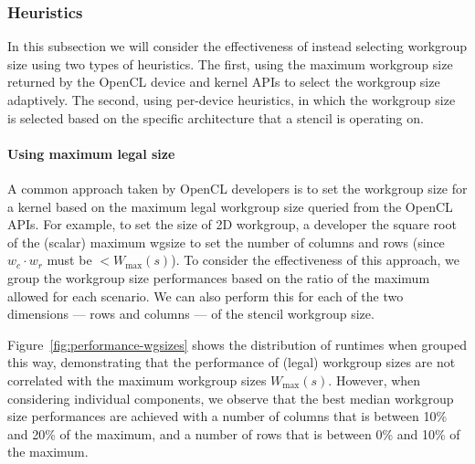 \documentclass[nonatbib,preprint,10pt]{sigplanconf}
\begin{document}
\subsubsection{Heuristics}

In this subsection we will consider the effectiveness of instead
selecting workgroup size using two types of heuristics. The first,
using the maximum workgroup size returned by the OpenCL device and
kernel APIs to select the workgroup size adaptively. The second, using
per-device heuristics, in which the workgroup size is selected based
on the specific architecture that a stencil is operating on.

\paragraph{Using maximum legal size}

A common approach taken by OpenCL developers is to set the workgroup
size for a kernel based on the maximum legal workgroup size queried
from the OpenCL APIs. For example, to set the size of 2D workgroup, a
developer the square root of the (scalar) maximum wgsize to set the
number of columns and rows (since $w_c \cdot w_r$ must be
$< W_{\max}(s)$). To consider the effectiveness of this approach, we
group the workgroup size performances based on the ratio of the
maximum allowed for each scenario. We can also perform this for each
of the two dimensions --- rows and columns --- of the stencil
workgroup size.

Figure~\ref{fig:performance-wgsizes} shows the distribution of
runtimes when grouped this way, demonstrating that the performance of
(legal) workgroup sizes are not correlated with the maximum workgroup
sizes $W_{\max}(s)$. However, when considering individual components,
we observe that the best median workgroup size performances are
achieved with a number of columns that is between 10\% and 20\% of the
maximum, and a number of rows that is between 0\% and 10\% of the
maximum.

\end{document}
